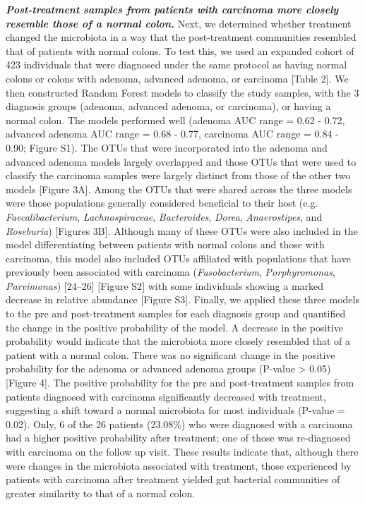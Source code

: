 \documentclass[12pt,]{article}
\begin{document}
\textbf{\emph{Post-treatment samples from patients with carcinoma more
closely resemble those of a normal colon.}} Next, we determined whether
treatment changed the microbiota in a way that the post-treatment
communities resembled that of patients with normal colons. To test this,
we used an expanded cohort of 423 individuals that were diagnosed under
the same protocol as having normal colons or colons with adenoma,
advanced adenoma, or carcinoma {[}Table 2{]}. We then constructed Random
Forest models to classify the study samples, with the 3 diagnosis groups
(adenoma, advanced adenoma, or carcinoma), or having a normal colon. The
models performed well (adenoma AUC range = 0.62 - 0.72, advanced adenoma
AUC range = 0.68 - 0.77, carcinoma AUC range = 0.84 - 0.90; Figure S1).
The OTUs that were incorporated into the adenoma and advanced adenoma
models largely overlapped and those OTUs that were used to classify the
carcinoma samples were largely distinct from those of the other two
models {[}Figure 3A{]}. Among the OTUs that were shared across the three
models were those populations generally considered beneficial to their
host (e.g. \emph{Faecalibacterium}, \emph{Lachnospiraceae},
\emph{Bacteroides}, \emph{Dorea}, \emph{Anaerostipes}, and
\emph{Roseburia}) {[}Figures 3B{]}. Although many of these OTUs were
also included in the model differentiating between patients with normal
colons and those with carcinoma, this model also included OTUs
affiliated with populations that have previously been associated with
carcinoma (\emph{Fusobacterium}, \emph{Porphyromonas},
\emph{Parvimonas}) {[}24--26{]} {[}Figure S2{]} with some individuals
showing a marked decrease in relative abundance {[}Figure S3{]}.
Finally, we applied these three models to the pre and post-treatment
samples for each diagnosis group and quantified the change in the
positive probability of the model. A decrease in the positive
probability would indicate that the microbiota more closely resembled
that of a patient with a normal colon. There was no significant change
in the positive probability for the adenoma or advanced adenoma groups
(P-value \textgreater{} 0.05) {[}Figure 4{]}. The positive probability
for the pre and post-treatment samples from patients diagnosed with
carcinoma significantly decreased with treatment, suggesting a shift
toward a normal microbiota for most individuals (P-value = 0.02). Only,
6 of the 26 patients (23.08\%) who were diagnosed with a carcinoma had a
higher positive probability after treatment; one of those was
re-diagnosed with carcinoma on the follow up visit. These results
indicate that, although there were changes in the microbiota associated
with treatment, those experienced by patients with carcinoma after
treatment yielded gut bacterial communities of greater similarity to
that of a normal colon.
\end{document}
